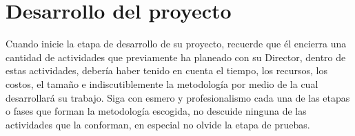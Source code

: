 \chapter{Desarrollo del proyecto}

Cuando inicie la etapa de desarrollo de su proyecto, recuerde que él encierra
una cantidad de actividades que previamente ha planeado con su Director,
dentro de estas actividades, debería haber tenido en cuenta el tiempo, los
recursos, los costos, el tamaño e indiscutiblemente la metodología por medio
de la cual desarrollará su trabajo. Siga con esmero y profesionalismo cada una
de las etapas o fases que forman la metodología escogida, no descuide ninguna
de las actividades que la conforman, en especial no olvide la etapa de pruebas.

